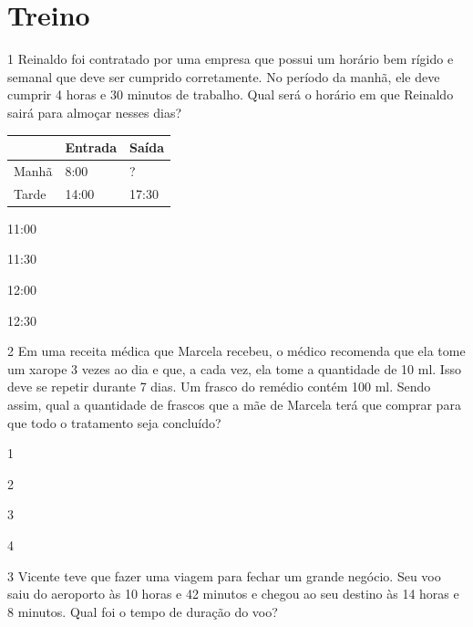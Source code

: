 \begin{mdframed}[linewidth=2pt,linecolor=salmao]
\mbox{}\vspace*{4cm}
\end{mdframed}

\pagebreak
\section*{Treino}

\num{1} Reinaldo foi contratado por uma empresa que possui um horário bem
rígido e semanal que deve ser cumprido corretamente. No período da manhã,
ele deve cumprir 4 horas e 30 minutos de trabalho. Qual será o horário em que
Reinaldo sairá para almoçar nesses dias?

\begin{longtable}[]{@{}lll@{}}
\toprule
& Entrada & Saída\tabularnewline
\midrule
\endhead
Manhã & 8:00 & ?\tabularnewline
Tarde & 14:00 & 17:30\tabularnewline
\bottomrule
\end{longtable}

\begin{escolha}
\item
  11:00
\item
  11:30
\item
  12:00
\item
  12:30
\end{escolha}


\num{2} Em uma receita médica que Marcela recebeu, o médico recomenda que ela tome um xarope 3
vezes ao dia e que, a cada vez, ela tome a quantidade de 10 ml. Isso deve se repetir durante 7
dias. Um frasco do remédio contém 100 ml. Sendo assim, qual a quantidade
de frascos que a mãe de Marcela terá que comprar para que todo o
tratamento seja concluído?

\begin{escolha}
\item
  1
\item
  2
\item
  3
\item
  4
\end{escolha}


\num{3} Vicente teve que fazer uma viagem para fechar um grande negócio. Seu
voo saiu do aeroporto às 10 horas e 42 minutos e chegou ao seu destino
às 14 horas e 8 minutos. Qual foi o tempo de duração do voo?

